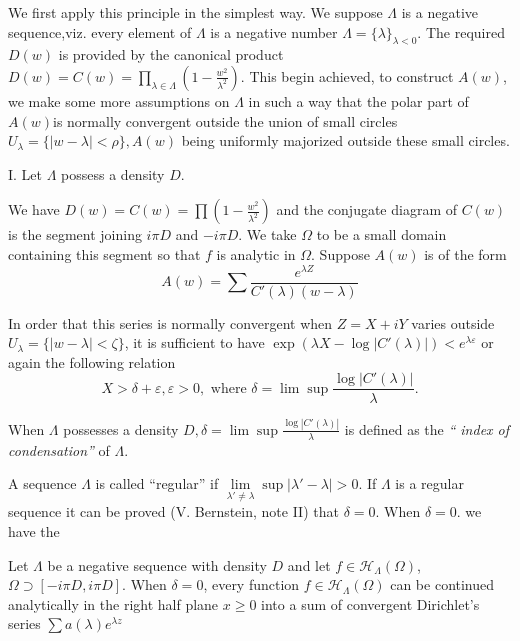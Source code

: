 We first apply this principle in the simplest way. We suppose
$\Lambda$ is a negative sequence,viz. every element of $\Lambda$ is a
negative number $\Lambda = \{ \lambda\}_{\lambda < 0}$. The required
$D(w)$ is provided by the canonical product $D (w) = C (w) = \prod
\limits_{ \lambda \in \Lambda} ( 1 - \frac{w^2}
  {\lambda^2})$. This begin achieved, to construct $A(w)$, we
  make some more assumptions on $\Lambda$ in such a way that the
  polar part of $A(w)$\pageoriginale is normally convergent outside the union
  of small circles $U_\lambda= \{ |w -\lambda| < \rho\}, A (w)$
  being uniformly majorized outside these small circles. 

\noindent I. Let $\Lambda$ possess a density $D$. 

 We have $D (w) = C(w)= \prod (1- \frac{w^2} {\lambda^2})$ and the
 conjugate diagram of $C(w)$ is the segment joining $i \pi D$ and $-i
 \pi D$. We take $\Omega$ to be a small domain containing this
 segment so that $f$ is analytic in $\Omega$. Suppose $A(w)$ is of
 the form 
 \begin{equation*}
   A (w) = \sum \frac{ e^{\lambda Z}} {C' (\lambda) (w -\lambda)}
   \tag{1}\label{chap13:sec2:eq1} 
 \end{equation*}

 In order that this series is normally convergent when $Z = X + iY$
 varies outside $U_\lambda= \{ \big|w-\lambda\big| < \zeta \}$, it is
 sufficient to have $ \exp (\lambda X - \log |C' (\lambda)|) < e
^{\lambda \varepsilon}$ or again the following relation 
 $$
 X > \delta + \varepsilon, \varepsilon > 0, \text{ where } \delta =
 \lim \sup \frac{ \log |C' (\lambda)|} {\lambda}. 
 $$

 \begin{defi*}
   When $\Lambda$ possesses a density $D, \delta = \lim \sup \frac{
     \log |C' (\lambda) |} {\lambda}$ is defined as the \textit {``
     index of condensation''} of $\Lambda$. 

 A sequence $\Lambda$ is called ``regular'' if $\lim \limits_{
  \lambda' \neq \lambda} \sup | \lambda' - \lambda| > 0$. If
 $\Lambda$ is a regular sequence it can be proved (V. Bernstein,
 note II) that $\delta = 0$. When $\delta = 0$. we have the 
 \end{defi*}

 \begin{theorem*}
 Let $\Lambda$ be a negative sequence with density $D$ and let $
 f \in \mathscr{H}_\Lambda (\Omega)$, $\Omega \supset [-i \pi D, i
  \pi D]$. When $\delta=0$, every function $f \in
 \mathscr{H}_\Lambda(\Omega)$ can be continued
 analytically in the right half plane $x \ge 0$ into a sum of
 convergent Dirichlet's series $\sum a (\lambda)e^{\lambda z}$ 
 \end{theorem*}

